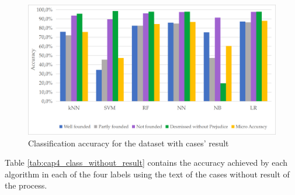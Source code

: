 \begin{figure}[htb]
    \centering
    \caption{Classification accuracy for the dataset with cases' result}
    \label{fig:cap4_class_with_result}
    \includegraphics[width=\textwidth]{images/chapters/cap4_classification_with_result.png}
    
\end{figure}

Table \ref{tab:cap4_class_without_result} contains the accuracy achieved by each algorithm in each of the four labels using the text of the cases without result of the process. 


